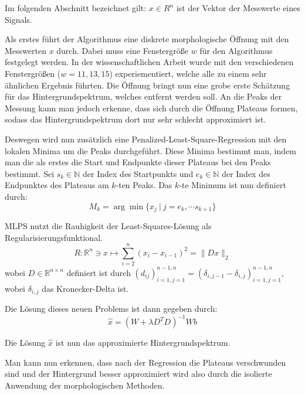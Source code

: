 \documentclass{article}
\newcommand{\R}[0]{\mathbb{R}}
\newcommand{\N}[0]{\mathbb{N}}
\begin{document}
Im folgenden Abschnitt bezeichnet gilt: $x \in R^n$ ist der Vektor der Messwerte eines Signals. 

Als erstes führt der Algorithmus eine diskrete morphologische Öffnung mit den Messwerten $x$ durch. Dabei muss eine Fenstergröße $w$ für den Algorithmus festgelegt werden.
In der wissenschaftlichen Arbeit wurde mit den verschiedenen Fenstergrößen ($w=11,13,15$) experiementiert, welche alle zu einem sehr ähnlichen Ergebnis führten.
Die Öffnung bringt nun eine grobe erste Schätzung für das Hintergrundspektrum, welches entfernt werden soll.
An die Peaks der Messung kann man jedoch erkenne, dass sich durch die Öffnung Plateaus formen, sodass das Hintergrundspektrum dort nur sehr schlecht approximiert ist.

Deswegen wird nun zusätzlich eine Penalized-Least-Square-Regression mit den lokalen Minima um die Peaks durchgeführt.
Diese Minima bestimmt man, indem man die als erstes die Start und Endpunkte dieser Plateaus bei den Peaks bestimmt.
Sei $s_k \in \N$ der Index des Startpunkts und $e_k \in \N$ der Index des Endpunktes des Plateaus am $k$-ten Peaks. Das $k$-te Minimum ist nun definiert durch:
\begin{equation}
    M_k = \arg\min \{x_j \: | \: j=e_k,\cdots s_{k+1}\}
\end{equation}

MLPS nutzt die Rauhigkeit der Least-Squares-Lösung als Regularisierungsfunktional.
\begin{equation}
    R: \R^n \ni x \mapsto \sum_{i=2}^{n} (x_i - x_{i-1})^2 = \lVert Dx \rVert_2
\end{equation}
wobei $D \in \R^{n\times n}$ definiert ist durch $(d_{ij})_{i=1,j=1}^{n-1,n} = (\delta_{i,j-1} - \delta_{i,j})_{i=1,j=1}^{n-1,n}$, wobei $\delta_{i,j}$ das Kronecker-Delta ist.

Die Lösung dieses neuen Problems ist dann gegeben durch:
\begin{equation}
    \hat{x} = (W + \lambda D^TD)^{-1}Wb
\end{equation}

Die Lösung $\hat{x}$ ist nun das approximierte Hintergrundspektrum.

Man kann nun erkennen, dass nach der Regression die Plateaus verschwunden sind und der Hintergrund besser approximiert wird also durch die isolierte Anwendung der morphologischen Methoden. 
\end{document}
